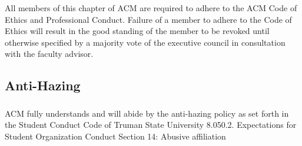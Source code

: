 \documentclass[12pt]{article}
\begin{document}
\subsubsection{}	All members of this chapter of ACM are required to adhere to the ACM Code of Ethics and Professional Conduct. Failure of a member to adhere to the Code of Ethics will result in the good standing of the member to be revoked until otherwise specified by a majority vote of the executive council in consultation with the faculty advisor.
\subsection{Anti-Hazing}
\subsubsection{}	ACM fully understands and will abide by the anti-hazing policy as set forth in the Student Conduct Code of Truman State University 8.050.2. Expectations for Student Organization Conduct Section 14: Abusive affiliation
	
\end{document}
